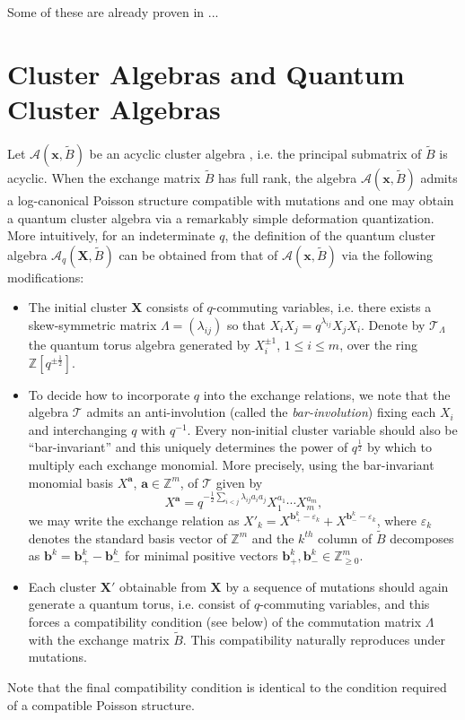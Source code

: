 \documentclass[12pt]{amsart}
\newcommand{\bfa}{\mathbf{a}}
\newcommand{\bfb}{\mathbf{b}}
\newcommand{\bfx}{\mathbf{x}}
\newcommand{\bfX}{\mathbf{X}}
\newcommand{\cA}{\mathcal{A}}
\newcommand{\cT}{\mathcal{T}}
\newcommand{\half}{{\frac{1}{2}}}
\newcommand{\ZZ}{\mathbb{Z}}
\begin{document}
  Some of these are already proven in \cite{demonet}...

  \section{Cluster  Algebras and Quantum Cluster Algebras} Let $\cA(\bfx,\tilde B)$ be an acyclic cluster algebra \cite{berenstein-fomin-zelevinsky}, i.e. the principal submatrix of $\tilde B$ is acyclic.  
  When the exchange matrix $\tilde B$ has full rank, the algebra $\cA(\bfx,\tilde B)$ admits a log-canonical Poisson structure compatible with mutations \cite{gekhtman-shapiro-vainshtein} and one may obtain a quantum cluster algebra via a remarkably simple deformation quantization.  
  More intuitively, for an indeterminate $q$, the definition of the quantum cluster algebra $\cA_q(\bfX,\tilde B)$ can be obtained from that of $\cA(\bfx,\tilde B)$ via the following modifications:
  \begin{itemize}
    \item The initial cluster $\bfX$ consists of $q$-commuting variables, i.e. there exists a skew-symmetric matrix $\Lambda=(\lambda_{ij})$ so that $X_iX_j=q^{\lambda_{ij}}X_jX_i$.  
    Denote by $\cT_\Lambda$ the quantum torus algebra generated by $X_i^{\pm1}$, $1\le i\le m$, over the ring $\ZZ[q^{\pm\half}]$.
    \item To decide how to incorporate $q$ into the exchange relations, we note that the algebra $\cT$ admits an anti-involution (called the \emph{bar-involution}) fixing each $X_i$ and interchanging $q$ with $q^{-1}$.
    Every non-initial cluster variable should also be ``bar-invariant'' and this uniquely determines the power of $q^\half$ by which to multiply each exchange monomial.  
    More precisely, using the bar-invariant monomial basis $X^\bfa$, $\bfa\in\ZZ^m$, of $\cT$ given by
    \[X^\bfa=q^{-\half\sum\limits_{i<j}\lambda_{ij}a_ia_j}X_1^{a_1}\cdots X_m^{a_m},\]
    we may write the exchange relation as $X'_k=X^{\bfb_+^k-\varepsilon_k}+X^{\bfb_-^k-\varepsilon_k}$, where $\varepsilon_k$ denotes the standard basis vector of $\ZZ^m$ and the $k^{th}$ column of $\tilde B$ decomposes as $\bfb^k=\bfb^k_+-\bfb^k_-$ for minimal positive vectors $\bfb^k_+,\bfb^k_-\in\ZZ_{\ge0}^m$.
    \item Each cluster $\bfX'$ obtainable from $\bfX$ by a sequence of mutations should again generate a quantum torus, i.e. consist of $q$-commuting variables, and this forces a compatibility condition (see below) of the commutation matrix $\Lambda$ with the exchange matrix $\tilde B$.
    This compatibility naturally reproduces under mutations.
  \end{itemize}
  Note that the final compatibility condition is identical to the condition required of a compatible Poisson structure.
  
\end{document}
